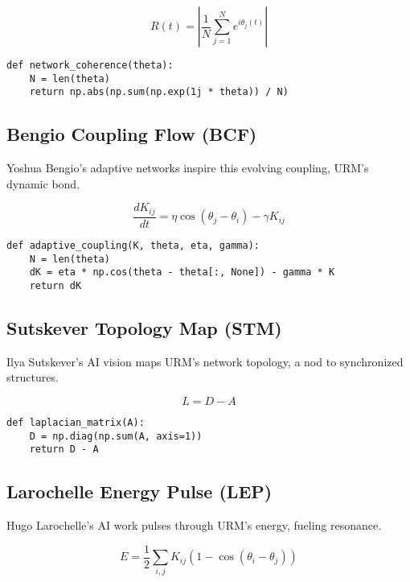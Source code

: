 \documentclass[12pt]{article}
\begin{document}
\begin{equation}
    R(t) = \left| \frac{1}{N} \sum_{j=1}^N e^{i \theta_j(t)} \right|
\end{equation}

\begin{lstlisting}[caption={Network Coherence}]
def network_coherence(theta):
    N = len(theta)
    return np.abs(np.sum(np.exp(1j * theta)) / N)
\end{lstlisting}

\subsection{Bengio Coupling Flow (BCF)}

Yoshua Bengio’s adaptive networks inspire this evolving coupling, URM’s dynamic bond.

\begin{equation}
    \frac{dK_{ij}}{dt} = \eta \cos(\theta_j - \theta_i) - \gamma K_{ij}
\end{equation}

\begin{lstlisting}[caption={Adaptive Coupling}]
def adaptive_coupling(K, theta, eta, gamma):
    N = len(theta)
    dK = eta * np.cos(theta - theta[:, None]) - gamma * K
    return dK
\end{lstlisting}

\subsection{Sutskever Topology Map (STM)}

Ilya Sutskever’s AI vision maps URM’s network topology, a nod to synchronized structures.

\begin{equation}
    L = D - A
\end{equation}

\begin{lstlisting}[caption={Laplacian Matrix}]
def laplacian_matrix(A):
    D = np.diag(np.sum(A, axis=1))
    return D - A
\end{lstlisting}

\subsection{Larochelle Energy Pulse (LEP)}

Hugo Larochelle’s AI work pulses through URM’s energy, fueling resonance.

\begin{equation}
    E = \frac{1}{2} \sum_{i,j} K_{ij} (1 - \cos(\theta_i - \theta_j))
\end{equation}
\end{document}
